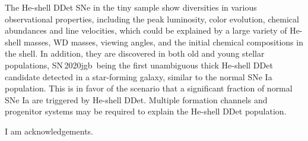\documentclass[twocolumn]{aastex631}
\newcommand{\sn}{SN\,2020jgb}
\begin{document}
The He-shell DDet SNe in the tiny sample show diversities in various observational properties, including the peak luminosity, color evolution, chemical abundances and line velocities, which could be explained by a large variety of He-shell masses, WD masses, viewing angles, and the initial chemical compositions in the shell. In addition, they are discovered in both old and young stellar populations, \sn\ being the first unambiguous thick He-shell DDet candidate detected in a star-forming galaxy, similar to the normal SNe Ia population. This is in favor of the scenario that a significant fraction of normal SNe Ia are triggered by He-shell DDet. Multiple formation channels and progenitor systems may be required to explain the He-shell DDet population.

\begin{acknowledgements}
    I am acknowledgements.
\end{acknowledgements}







\end{document}
